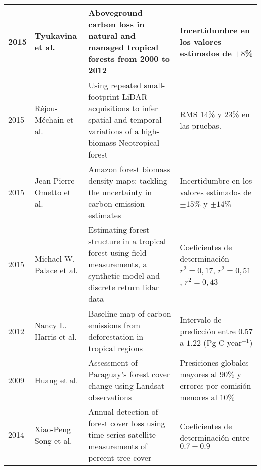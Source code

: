 \begin{longtable}{|p{3cm}|p{3cm}|p{3cm}|p{3cm}|}
		2015          & Tyukavina et al.                                       & Aboveground carbon loss in natural and managed tropical forests from 2000 to 2012                                                                                      & Incertidumbre en los valores estimados de $ \pm 8 $\%                                     \\ \hline
		2015          & R\'ejou-M\'echain et al.                       & Using repeated small-footprint LiDAR acquisitions to infer spatial and temporal variations of a high-biomass Neotropical forest                                        & RMS 14\% y 23\% en las pruebas.                                                          \\ \hline
		2015          & Jean Pierre Ometto et al.                              & Amazon forest biomass density maps: tackling the uncertainty in carbon emission estimates                                                                              & Incertidumbre en los valores estimados de $ \pm 15\% $ y $ \pm 14\% $                     \\ \hline
		2015          & Michael W. Palace et al.                               & Estimating forest structure in a tropical forest using field measurements, a synthetic model and discrete return lidar data                                            & Coeficientes de determinaci\'on $ r^{2}=0,17 $, $ r^{2}=0,51 $, $ r^{2}=0,43 $            \\ \hline
		2012          & Nancy L. Harris et al.                                 & Baseline map of carbon emissions from deforestation in tropical regions                                                                                                & Intervalo de predicci\'on entre $ 0.57 $ a $ 1.22 $ (Pg C year$ ^{-1} $)                      \\ \hline
		2009          & Huang et al.                                           & Assessment of Paraguay's forest cover change using Landsat observations                                                                                                & Presiciones globales mayores al $90\%$ y errores por comisi\'on menores al $10\%$         \\ \hline
		2014          & Xiao-Peng Song et al.                                  & Annual detection of forest cover loss using time series satellite measurements of percent tree cover                                                                   & Coeficientes de determinaci\'on entre $ 0.7 - 0.9 $                                       \\ \hline

\end{longtable}
